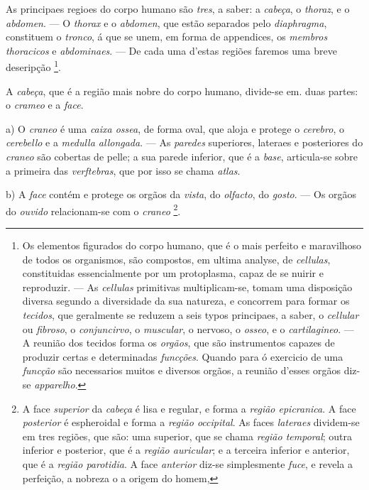 As principaes regioes do corpo humano são \emph{tres}, a saber: a \emph{cabeça}, o \emph{thoraz}, e o \emph{abdomen}. --- O \emph{thorax} e o \emph{abdomen}, que estão separados pelo \emph{diaphragma}, constituem o \emph{tronco}, á que se unem, em forma de appendices, os \emph{membros thoracicos} e \emph{abdominaes}. --- De cada uma d'estas regiões faremos uma breve deseripção \footnote{Os elementos figurados do corpo humano, que é o mais perfeito e maravilhoso de todos os organismos, são compostos, em ultima analyse, de \emph{cellulas}, constituidas essencialmente por um protoplasma, capaz de se nuirir e reproduzir. --- As \emph{cellulas} primitivas multiplicam-se, tomam uma disposição diversa segundo a diversidade da sua natureza, e concorrem para formar os \emph{tecidos}, que geralmente se reduzem a seis typos principaes, a saber, o \emph{cellular} ou \emph{fibroso}, o \emph{conjuncirvo}, o \emph{muscular}, o nervoso, o \emph{osseo}, e o \emph{cartilagineo}. --- A reunião dos tecidos forma os \emph{orgãos}, que são instrumentos capazes de produzir certas e determinadas \emph{funcções}. Quando para ó exercicio de uma \emph{funcção} são necessarios muitos e diversos orgãos, a reunião d'esses orgãos diz-se \emph{apparelho}.}.


A \emph{cabeça}, que é a região mais nobre do corpo humano, divide-se em. duas partes: o \emph{crameo} e a \emph{face}.

a) O \emph{craneo} é uma \emph{caixa ossea}, de forma oval, que aloja e protege o \emph{cerebro}, o \emph{cerebello} e a \emph{medulla allongada}. --- As \emph{paredes} superiores, lateraes e posteriores do \emph{craneo} são cobertas de pelle; a sua parede inferior, que é a \emph{base}, articula-se sobre a primeira das \emph{verftebras}, que por isso se chama \emph{atlas}.

b) A \emph{face} contém e protege os orgãos da \emph{vista}, do \emph{olfacto}, do \emph{gosto}. --- Os orgãos do \emph{ouvido} relacionam-se com o \emph{craneo} \footnote{A face \emph{superior} da \emph{cabeça} é lisa e regular, e forma a \emph{região epicranica}. A face \emph{posterior} é espheroidal e forma a \emph{região occipital}. As faces \emph{lateraes} dividem-se em tres regiões, que são: uma superior, que se chama \emph{região temporal}; outra inferior e posterior, que é a \emph{região auricular}; e a terceira inferior e anterior, que é a \emph{região parotidia}. A face \emph{anterior} diz-se simplesmente \emph{fuce}, e revela a perfeição, a nobreza o a origem do homem,}.

